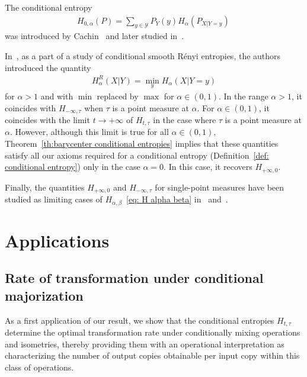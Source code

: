 \documentclass[aps,pra,11pt,onecolumn,nofootinbib,tightenlines]{revtex4-2}
\theoremstyle{definition}
\newcommand{\mc}[1]{\mathcal{#1}}
\begin{document}
The conditional entropy
 \begin{align}
H_{0,\alpha}(P)=\sum_{y\in\mc Y} P_Y(y)H_\alpha(P_{X|Y=y})\,
 \end{align}
 was introduced by Cachin~\cite{cachin1997entropy} and later studied in~\cite{teixeira2012conditional}.

In~\cite{renner2005simple},
as a part of a study of conditional smooth R\'enyi entropies, the authors introduced the quantity
\begin{align}
    H^R_\alpha(X|Y) = \min _{y} H_\alpha(X|Y=y)
\end{align}
for $\alpha > 1$ and with $\min$ replaced by $\max$ for $\alpha \in (0,1)$. In the range $\alpha>1$, it coincides with $H_{-\infty,\tau}$ when $\tau$ is a point measure at $\alpha$.
For $\alpha \in (0,1)$, it coincides with the limit $t\rightarrow +\infty$ of $H_{t,\tau}$ in the case where $\tau$ is a point measure at $\alpha$. However, although this limit is true for all $\alpha \in (0,1)$, Theorem~\ref{th:barycenter conditional entropies} implies that these quantities satisfy all our axioms required for a conditional entropy  (Definition~\ref{def: conditional entropy}) only in the case $\alpha = 0$.
In this case, it recovers \(H_{+\infty,0}\).  

Finally, the quantities $ H_{+\infty,0}$ and $H_{-\infty,\tau}$ for single-point measures have been studied as limiting cases of
$H_{\alpha,\beta}$~\eqref{eq: H alpha beta} in~\cite{li2025two} and~\cite{rubboli2024quantum}.



 
\section{Applications}
\label{sec: Applications}
\subsection{Rate of transformation under conditional majorization}
As a first application of our result, we show that the conditional entropies $H_{t,\tau}$ determine the optimal transformation rate under conditionally mixing operations and isometries, thereby providing them with an operational interpretation as characterizing the number of output copies obtainable per input copy within this class of operations.
\end{document}
